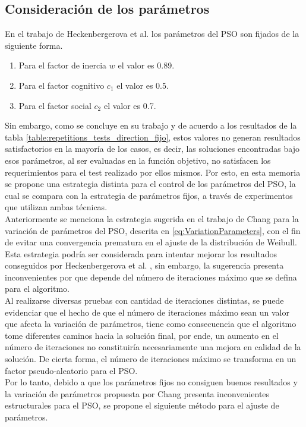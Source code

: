 \subsection{Consideración de los parámetros}\label{subsec:parametros_new}
En el trabajo de Heckenbergerova et al. \cite{Heckenbergerova15} los parámetros del PSO son fijados de la siguiente forma.
\begin{enumerate}
  \item Para el factor de inercia $w$ el valor es 0.89.
  \item Para el factor cognitivo $c_1$ el valor es 0.5.
  \item Para el factor social $c_2$ el valor es 0.7.
\end{enumerate}
Sin embargo, como se concluye en su trabajo y de acuerdo a los resultados de la tabla \ref{table:repetitions_tests_direction_fijo}, estos valores no generan resultados satisfactorios en la mayoría de los casos, es decir, las soluciones encontradas bajo esos parámetros, al ser evaluadas en la función objetivo, no satisfacen los requerimientos para el test realizado por ellos mismos. Por esto, en esta memoria se propone una estrategia distinta para el control de los parámetros del PSO, la cual se compara con la estrategia de parámetros fijos, a través de experimentos que utilizan ambas técnicas.\\ 
Anteriormente se menciona la estrategia sugerida en el trabajo de Chang \cite{Chang10_2} para la variación de parámetros del PSO, descrita en \ref{eq:VariationParameters}, con el fin de evitar una convergencia prematura en el ajuste de la distribución de Weibull. Esta estrategia podría ser considerada para intentar mejorar los resultados conseguidos por Heckenbergerova et al. \cite{Heckenbergerova15}, sin embargo, la sugerencia presenta inconvenientes por que depende del número de iteraciones máximo que se defina para el algoritmo.\\
Al realizarse diversas pruebas con cantidad de iteraciones distintas, se puede evidenciar que el hecho de que el número de iteraciones máximo sean un valor que afecta la variación de parámetros, tiene como consecuencia que el algoritmo tome diferentes caminos hacia la solución final, por ende, un aumento en el número de iteraciones no constituiría necesariamente una mejora en calidad de la solución. De cierta forma, el número de iteraciones máximo se transforma en un factor pseudo-aleatorio para el PSO.\\
Por lo tanto, debido a que los parámetros fijos no consiguen buenos resultados y la variación de parámetros propuesta por Chang \cite{Chang10_2} presenta inconvenientes estructurales para el PSO, se propone el siguiente método para el ajuste de parámetros.\\

